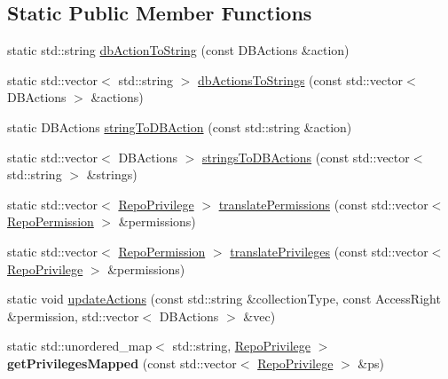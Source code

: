 \subsection*{Static Public Member Functions}
\begin{DoxyCompactItemize}
\item 
static std\+::string \hyperlink{classrepo_1_1core_1_1model_1_1_repo_role_a258f33ddeaf2335b1aabdcc59ba5521e}{db\+Action\+To\+String} (const D\+B\+Actions \&action)
\item 
static std\+::vector$<$ std\+::string $>$ \hyperlink{classrepo_1_1core_1_1model_1_1_repo_role_ae59519f477d028545399dbe2a68a95f8}{db\+Actions\+To\+Strings} (const std\+::vector$<$ D\+B\+Actions $>$ \&actions)
\item 
static D\+B\+Actions \hyperlink{classrepo_1_1core_1_1model_1_1_repo_role_a8f8e3344e117cced8a36b12096a360b4}{string\+To\+D\+B\+Action} (const std\+::string \&action)
\item 
static std\+::vector$<$ D\+B\+Actions $>$ \hyperlink{classrepo_1_1core_1_1model_1_1_repo_role_af58cbbb10e2278d1f50eb963b8701ee9}{strings\+To\+D\+B\+Actions} (const std\+::vector$<$ std\+::string $>$ \&strings)
\item 
static std\+::vector$<$ \hyperlink{structrepo_1_1core_1_1model_1_1_repo_privilege}{Repo\+Privilege} $>$ \hyperlink{classrepo_1_1core_1_1model_1_1_repo_role_a8978e7154d7f5acaa0db07c21084429b}{translate\+Permissions} (const std\+::vector$<$ \hyperlink{structrepo_1_1core_1_1model_1_1_repo_permission}{Repo\+Permission} $>$ \&permissions)
\item 
static std\+::vector$<$ \hyperlink{structrepo_1_1core_1_1model_1_1_repo_permission}{Repo\+Permission} $>$ \hyperlink{classrepo_1_1core_1_1model_1_1_repo_role_a1fa588241e2ad568d144cd2684c0b652}{translate\+Privileges} (const std\+::vector$<$ \hyperlink{structrepo_1_1core_1_1model_1_1_repo_privilege}{Repo\+Privilege} $>$ \&permissions)
\item 
static void \hyperlink{classrepo_1_1core_1_1model_1_1_repo_role_ab6690ec79ef6ce80db77814b84b4537d}{update\+Actions} (const std\+::string \&collection\+Type, const Access\+Right \&permission, std\+::vector$<$ D\+B\+Actions $>$ \&vec)
\item 
\hypertarget{classrepo_1_1core_1_1model_1_1_repo_role_a613bd0dc586e4f104a2015cd497fb8b3}{}static std\+::unordered\+\_\+map$<$ std\+::string, \hyperlink{structrepo_1_1core_1_1model_1_1_repo_privilege}{Repo\+Privilege} $>$ {\bfseries get\+Privileges\+Mapped} (const std\+::vector$<$ \hyperlink{structrepo_1_1core_1_1model_1_1_repo_privilege}{Repo\+Privilege} $>$ \&ps)\label{classrepo_1_1core_1_1model_1_1_repo_role_a613bd0dc586e4f104a2015cd497fb8b3}

\end{DoxyCompactItemize}
